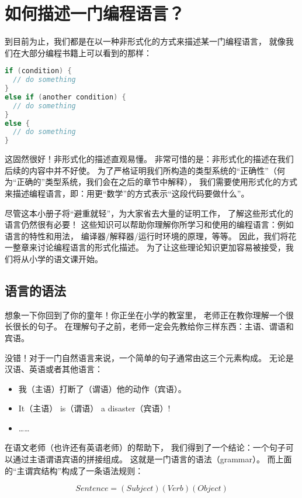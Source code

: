 \documentclass[../main.tex]{subfiles}
\begin{document}
  \section{如何描述一门编程语言？}
  \indent 到目前为止，我们都是在以一种非形式化的方式来描述某一门编程语言，
  就像我们在大部分编程书籍上可以看到的那样：

\begin{lstlisting}[language=c]
if (condition) {
  // do something
}
else if (another condition) {
  // do something
}
else {
  // do something
}
\end{lstlisting}

  \indent 这固然很好！非形式化的描述直观易懂。
  非常可惜的是：非形式化的描述在我们后续的内容中并不好使。
  为了严格证明我们所构造的类型系统的“正确性”（何为“正确的”类型系统，我们会在之后的章节中解释），
  我们需要使用形式化的方式来描述编程语言，即：用更“数学”的方式表示“这段代码要做什么”。

  \indent 尽管这本小册子将“避重就轻”，为大家省去大量的证明工作，
  了解这些形式化的语言仍然很有必要！
  这些知识可以帮助你理解你所学习和使用的编程语言：例如语言的特性和用法，
  编译器/解释器/运行时环境的原理，等等。\cite{edu}
  因此，我们将花一整章来讨论编程语言的形式化描述。
  为了让这些理论知识更加容易被接受，我们将从小学的语文课开始。

  \subsection{语言的语法}
  \indent 想象一下你回到了你的童年！你正坐在小学的教室里，
  老师正在教你理解一个很长很长的句子。
  在理解句子之前，老师一定会先教给你三样东西：主语、谓语和宾语。
  
  \indent 没错！对于一门自然语言来说，一个简单的句子通常由这三个元素构成。
  无论是汉语、英语或者其他语言：

  \begin{itemize}
    \item 我（主语）打断了（谓语）他的动作（宾语）。
    \item It（主语） is（谓语） a disaster（宾语）!
    \item ……
  \end{itemize}

  \indent 在语文老师（也许还有英语老师）的帮助下，
  我们得到了一个结论：一个句子可以通过主语谓语宾语的拼接组成。
  这就是一门语言的语法（grammar）。
  而上面的“主谓宾结构”构成了一条语法规则：

  $$Sentence = (Subject) (Verb) (Object)$$
  
\end{document}
